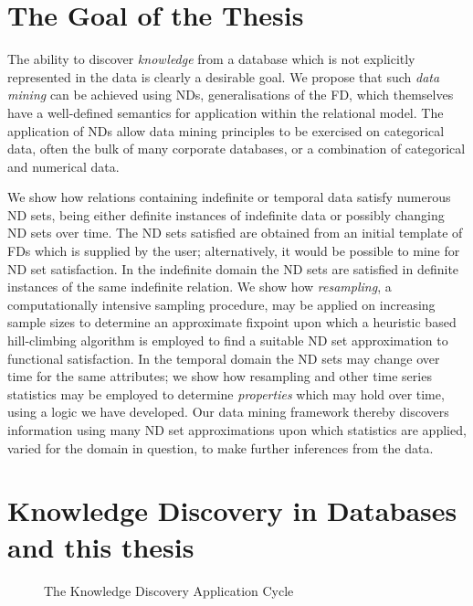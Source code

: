 \section{The Goal of the Thesis}\label{sec:int_hyp}

The ability to discover {\em knowledge} from a database which is not
explicitly represented in the data is clearly a desirable goal. We
propose that such {\em data mining} can be achieved using NDs,
generalisations of the FD, 
which themselves have a well-defined semantics for application within
the relational model. The application of NDs allow data
mining principles to be exercised on categorical data, often the bulk
of many corporate databases, or a combination of categorical and
numerical data. 

\smallskip
We show how relations containing indefinite or temporal data satisfy
numerous ND sets, being either definite instances of indefinite data
or possibly changing ND sets over time. The ND sets satisfied are
obtained from an initial template of FDs which is supplied by the
user; alternatively, it would be possible to mine for ND set
satisfaction. In the indefinite
domain the ND sets are satisfied in definite instances of the same indefinite
relation. We show how {\em resampling}, a computationally
intensive sampling procedure, may be applied on increasing sample
sizes to determine an approximate fixpoint upon which a heuristic based
hill-climbing algorithm is employed to find a suitable ND set
approximation to functional satisfaction. 
In the temporal domain the ND sets may change over time
for the same attributes; we
show how resampling and other time series statistics may be employed
to determine {\em properties} which may hold over time, using a logic
we have developed. Our data
mining framework thereby discovers information using many ND set
approximations upon which statistics are applied, varied for the
domain in question, to make further inferences from the data.

\section{Knowledge Discovery in Databases and this thesis}\label{sec:int_kdd}

 
\begin{figure}
\centerline{}
\caption{\label{fig:kd_process}The Knowledge Discovery
Application Cycle}
\end{figure}

